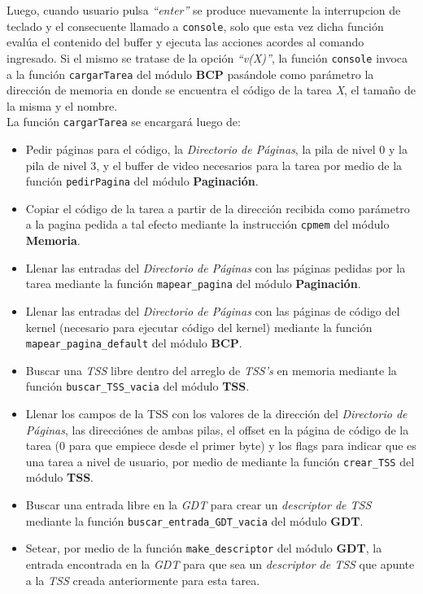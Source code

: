 \documentclass[11pt, a4paper]{article}
\begin{document}
\begin{enumerate}
		Luego, cuando usuario pulsa \textit{``enter''} se produce nuevamente la interrupcion de teclado y el consecuente llamado a \texttt{console}, solo que esta vez dicha función evalúa el contenido del buffer y ejecuta las acciones acordes al comando ingresado. Si el mismo se tratase de la opción \textit{``v(X)''}, la función \texttt{console} invoca a la función \texttt{cargarTarea} del módulo \textbf{BCP} pasándole como parámetro la dirección de memoria en donde se encuentra el código de la tarea \textit{X}, el tamaño de la misma y el nombre. \\
		La función \texttt{cargarTarea} se encargará luego de:
		\begin{itemize}
			\item Pedir páginas para el código, la \textit{Directorio de Páginas}, la pila de nivel 0 y la pila de nivel 3, y el buffer de video necesarios para la tarea por medio de la función \texttt{pedirPagina} del módulo \textbf{Paginación}.
			\item Copiar el código de la tarea a partir de la dirección recibida como parámetro a la pagina pedida a tal efecto mediante la instrucción \texttt{cpmem} del módulo \textbf{Memoria}.
			\item Llenar las entradas del \textit{Directorio de Páginas} con las páginas pedidas por la tarea mediante la función \texttt{mapear\_pagina} del módulo \textbf{Paginación}.
			\item Llenar las entradas del \textit{Directorio de Páginas} con las páginas de código del kernel (necesario para ejecutar código del kernel) mediante la función \texttt{mapear\_pagina\_default} del módulo \textbf{BCP}.
			\item Buscar una \textit{TSS} libre dentro del arreglo de \textit{TSS's} en memoria mediante la función \texttt{buscar\_TSS\_vacia} del módulo \textbf{TSS}.
			\item Llenar los campos de la TSS con los valores de la dirección del \textit{Directorio de Páginas}, las direcciónes de ambas pilas, el offset en la página de código de la tarea (0 para que empiece desde el primer byte) y los flags para indicar que es una tarea a nivel de usuario, por medio de mediante la función \texttt{crear\_TSS} del módulo \textbf{TSS}.
			\item Buscar una entrada libre en la \textit{GDT} para crear un \textit{descriptor de TSS} mediante la función \texttt{buscar\_entrada\_GDT\_vacia} del módulo \textbf{GDT}.
			\item Setear, por medio de la función \texttt{make\_descriptor} del módulo \textbf{GDT}, la entrada encontrada en la \textit{GDT} para que sea un \textit{descriptor de TSS} que apunte a la \textit{TSS} creada anteriormente para esta tarea.

\end{itemize}
\end{enumerate}
\end{document}
